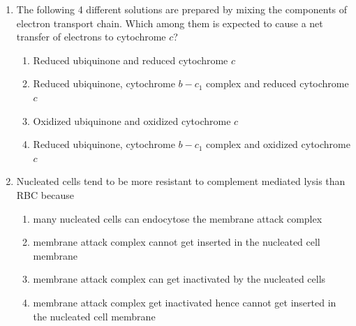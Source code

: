 \documentclass[journal,12pt,onecolumn]{IEEEtran}
\begin{document}
\begin{enumerate}
\item The following 4 different solutions are prepared by mixing the components of electron transport chain. Which among them is expected to cause a net transfer of electrons to cytochrome $c$?
\begin{multicols}{2}
\begin{enumerate}[label=(\Alph*)]
\item Reduced ubiquinone and reduced cytochrome $c$
\item Reduced ubiquinone, cytochrome $b-c_1$ complex and reduced cytochrome $c$
\item Oxidized ubiquinone and oxidized cytochrome $c$
\item Reduced ubiquinone, cytochrome $b-c_1$ complex and oxidized cytochrome $c$
\end{enumerate}
\end{multicols}

\item Nucleated cells tend to be more resistant to complement mediated lysis than RBC because
\begin{multicols}{2}
\begin{enumerate}[label=(\Alph*)]
\item many nucleated cells can endocytose the membrane attack complex
\item membrane attack complex cannot get inserted in the nucleated cell membrane
\item membrane attack complex can get inactivated by the nucleated cells
\item membrane attack complex get inactivated hence cannot get inserted in the nucleated cell membrane
\end{enumerate}
\end{multicols}


\end{enumerate}
\end{document}

